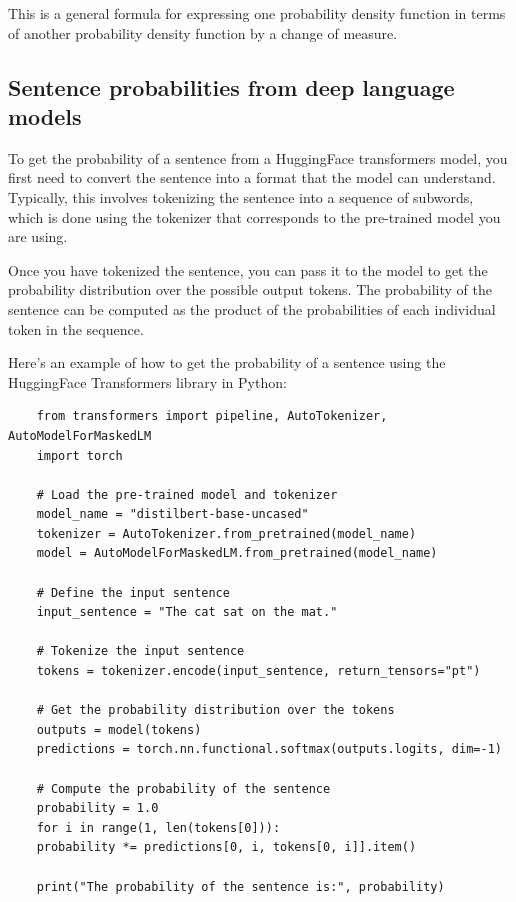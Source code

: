 \documentclass{article}
\begin{document}
This is a general formula for expressing one probability density function in terms of another probability density function by a change of measure.

\subsection{Sentence probabilities from deep language models}
\label{sec:huggingface_sentence_probs}

To get the probability of a sentence from a HuggingFace transformers model, you first need to convert the sentence into a format that the model can understand. Typically, this involves tokenizing the sentence into a sequence of subwords, which is done using the tokenizer that corresponds to the pre-trained model you are using.

Once you have tokenized the sentence, you can pass it to the model to get the probability distribution over the possible output tokens. The probability of the sentence can be computed as the product of the probabilities of each individual token in the sequence.

Here's an example of how to get the probability of a sentence using the HuggingFace Transformers library in Python:

\begin{verbatim}
    from transformers import pipeline, AutoTokenizer, AutoModelForMaskedLM
    import torch
    
    # Load the pre-trained model and tokenizer
    model_name = "distilbert-base-uncased"
    tokenizer = AutoTokenizer.from_pretrained(model_name)
    model = AutoModelForMaskedLM.from_pretrained(model_name)
    
    # Define the input sentence
    input_sentence = "The cat sat on the mat."
    
    # Tokenize the input sentence
    tokens = tokenizer.encode(input_sentence, return_tensors="pt")
    
    # Get the probability distribution over the tokens
    outputs = model(tokens)
    predictions = torch.nn.functional.softmax(outputs.logits, dim=-1)
    
    # Compute the probability of the sentence
    probability = 1.0
    for i in range(1, len(tokens[0])):
    probability *= predictions[0, i, tokens[0, i]].item()
    
    print("The probability of the sentence is:", probability)
\end{verbatim}
\end{document}
